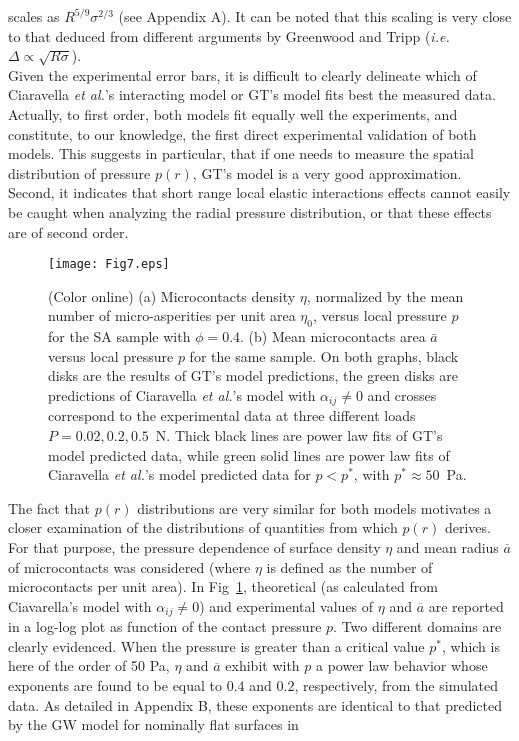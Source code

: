 \documentclass[pre,groupedaddress,showkeys,showpacs,twocolumn]{revtex4}
\begin{document}
scales as $R^{5/9}\sigma^{2/3}$ (see Appendix A). It can be noted that this scaling is very close to that deduced from different arguments by Greenwood and Tripp (\textit{i.e.} $\Delta \propto \sqrt{R\sigma}$).\\
Given the experimental error bars, it is difficult to clearly delineate which of Ciaravella \textit{et al.}'s interacting model or GT's model fits best the measured data. Actually, to first order, both models fit equally well the experiments, and constitute, to our knowledge, the first direct experimental validation of both models. This suggests in particular, that if one needs to measure the spatial distribution of pressure $p(r)$, GT's model is a very good approximation. Second, it indicates that short range local elastic interactions effects cannot easily be caught when analyzing the radial pressure distribution, or that these effects are of second order.\\
%
\begin{figure}
	\texttt{[image: Fig7.eps]}
	\caption{(Color online) (a) Microcontacts density $\eta$, normalized by the mean number of micro-asperities per unit area $\eta_0$, versus local pressure $p$ for the SA sample with $\phi = 0.4$. (b) Mean microcontacts area $\bar a$ versus local pressure $p$ for the same sample. On both graphs, black disks are the results of GT's model predictions, the green disks are predictions of Ciaravella \textit{et al.}'s model with $\alpha_{ij} \neq 0$ and crosses correspond to the experimental data at three different loads $P=0.02, 0.2, 0.5$~N. Thick black lines are power law fits of GT's model predicted data, while green solid lines are power law fits of Ciaravella \textit{et al.}'s model predicted data for $p<p^*$, with $p^* \approx 50$~Pa.}
	\label{fig:naCiaGT} 
\end{figure}
%
\indent The fact that $p(r)$ distributions are very similar for both models motivates a closer examination of the distributions of quantities from which $p(r)$ derives. For that purpose, the pressure dependence of surface density $\eta$ and mean radius $\overline{a}$ of microcontacts was considered (where $\eta$ is defined as the number of microcontacts per unit area). In Fig~\ref{fig:naCiaGT}, theoretical (as calculated from Ciavarella's model with $\alpha_{ij} \neq 0$) and experimental values of $\eta$ and $\overline{a}$ are reported in a log-log plot as function of the contact pressure $p$. Two different domains are clearly evidenced. When the pressure is greater than a critical value $p^*$, which is here of the order of 50 Pa, $\eta$ and $\overline{a}$ exhibit with $p$ a power law behavior whose exponents are found to be equal to $0.4$ and $0.2$, respectively, from the simulated data. As detailed in Appendix B, these exponents are identical to that predicted by the GW model for nominally flat surfaces in 
\end{document}
